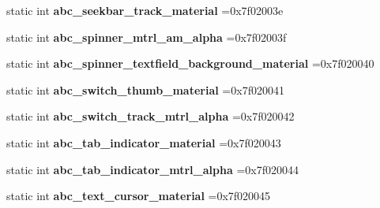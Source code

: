 \begin{DoxyCompactItemize}
\mbox{\label{classandroid_1_1support_1_1v4_1_1R_1_1drawable_af6bdd13ca94db97817dde0b2755de915}} 
static int {\bfseries abc\+\_\+seekbar\+\_\+track\+\_\+material} =0x7f02003e
\item 
\mbox{\label{classandroid_1_1support_1_1v4_1_1R_1_1drawable_a79dbf8f5d79cfc76047b3fea5a6267fc}} 
static int {\bfseries abc\+\_\+spinner\+\_\+mtrl\+\_\+am\+\_\+alpha} =0x7f02003f
\item 
\mbox{\label{classandroid_1_1support_1_1v4_1_1R_1_1drawable_a737ce14fd7f3ba5cd32823c4dfc4bf37}} 
static int {\bfseries abc\+\_\+spinner\+\_\+textfield\+\_\+background\+\_\+material} =0x7f020040
\item 
\mbox{\label{classandroid_1_1support_1_1v4_1_1R_1_1drawable_a88869c978db2a1b2e96a4b588424fda0}} 
static int {\bfseries abc\+\_\+switch\+\_\+thumb\+\_\+material} =0x7f020041
\item 
\mbox{\label{classandroid_1_1support_1_1v4_1_1R_1_1drawable_a2b99a52d496f4876c3c114d3c711d1af}} 
static int {\bfseries abc\+\_\+switch\+\_\+track\+\_\+mtrl\+\_\+alpha} =0x7f020042
\item 
\mbox{\label{classandroid_1_1support_1_1v4_1_1R_1_1drawable_ad9759a64e0a94091ecbe0d9bff68300a}} 
static int {\bfseries abc\+\_\+tab\+\_\+indicator\+\_\+material} =0x7f020043
\item 
\mbox{\label{classandroid_1_1support_1_1v4_1_1R_1_1drawable_af688bef66e4100ac32e72346f5d572dd}} 
static int {\bfseries abc\+\_\+tab\+\_\+indicator\+\_\+mtrl\+\_\+alpha} =0x7f020044
\item 
\mbox{\label{classandroid_1_1support_1_1v4_1_1R_1_1drawable_af2d42e7828d712efa0d7daeff0f2fd69}} 
static int {\bfseries abc\+\_\+text\+\_\+cursor\+\_\+material} =0x7f020045
\item 
\mbox{\label{classandroid_1_1support_1_1v4_1_1R_1_1drawable_a4daa8c4a08f51c9538f3b96c16d48c8e}} 

\end{DoxyCompactItemize}
